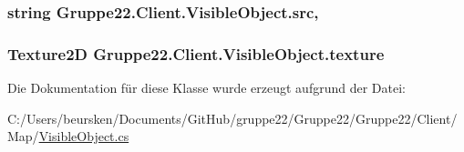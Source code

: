 \hypertarget{class_gruppe22_1_1_client_1_1_visible_object_aefc65a7eb0629fcbb6b65360a37de953}{
\subsubsection[{src}]{\setlength{\rightskip}{0pt plus 5cm}string Gruppe22.\-Client.\-Visible\-Object.\-src\hspace{0.3cm}{\ttfamily [get]}, {\ttfamily [set]}}}\label{class_gruppe22_1_1_client_1_1_visible_object_aefc65a7eb0629fcbb6b65360a37de953}




\hypertarget{class_gruppe22_1_1_client_1_1_visible_object_a09ac734c97a2e2745cf0f390a21e6458}{
\subsubsection[{texture}]{\setlength{\rightskip}{0pt plus 5cm}Texture2\-D Gruppe22.\-Client.\-Visible\-Object.\-texture\hspace{0.3cm}{\ttfamily [get]}}}\label{class_gruppe22_1_1_client_1_1_visible_object_a09ac734c97a2e2745cf0f390a21e6458}


Die Dokumentation für diese Klasse wurde erzeugt aufgrund der Datei\-:\begin{DoxyCompactItemize}
\item 
C\-:/\-Users/beursken/\-Documents/\-Git\-Hub/gruppe22/\-Gruppe22/\-Gruppe22/\-Client/\-Map/\hyperlink{_visible_object_8cs}{Visible\-Object.\-cs}\end{DoxyCompactItemize}
